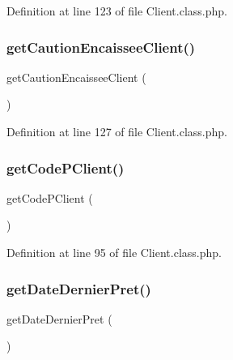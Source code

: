 Definition at line 123 of file Client.\+class.\+php.

\mbox{\label{class_client_a58ff00393a8812abb3bca76ad4ec772a}} 
\subsubsection{\texorpdfstring{get\+Caution\+Encaissee\+Client()}{getCautionEncaisseeClient()}}
{\footnotesize\ttfamily get\+Caution\+Encaissee\+Client (\begin{DoxyParamCaption}{ }\end{DoxyParamCaption})}



Definition at line 127 of file Client.\+class.\+php.

\mbox{\label{class_client_a9c6abbe6ff021062bf8387438ca4f6ad}} 
\subsubsection{\texorpdfstring{get\+Code\+P\+Client()}{getCodePClient()}}
{\footnotesize\ttfamily get\+Code\+P\+Client (\begin{DoxyParamCaption}{ }\end{DoxyParamCaption})}



Definition at line 95 of file Client.\+class.\+php.

\mbox{\label{class_client_a769e534725fbcf3bc437130dfd1c2430}} 
\subsubsection{\texorpdfstring{get\+Date\+Dernier\+Pret()}{getDateDernierPret()}}
{\footnotesize\ttfamily get\+Date\+Dernier\+Pret (\begin{DoxyParamCaption}{ }\end{DoxyParamCaption})}



